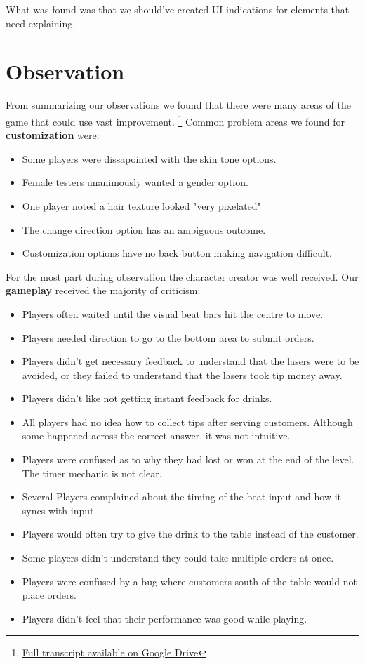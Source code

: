 \documentclass[twoside,twocolumn]{article}
\begin{document}
What was found was that we should've created UI indications for elements that need explaining.


\section{Observation}

From summarizing our observations we found that there were many areas
of the game that could use vast improvement.
\footnote{\hyperlink{https://docs.google.com/document/d/1CnQ9mCSRhZsAQdpiiN130khrFRj5-IsULWaGTs2_KgE/edit?usp=sharing}{Full transcript available on Google Drive}}
 Common problem areas we
found for \textbf{customization} were:
\begin{itemize}
    \item Some players were dissapointed with the skin tone options.
    \item Female testers unanimously wanted a gender option.
    \item One player noted a hair texture looked "very pixelated"
    \item The change direction option has an ambiguous outcome.
    \item Customization options have no back button making navigation difficult.
\end{itemize}
For the most part during observation the character creator was well received. Our \textbf{gameplay}
received the majority of criticism:
\begin{itemize}

    \item Players often waited until the visual beat bars hit the centre to move.
    \item Players needed direction to go to the bottom area to submit orders.
    \item Players didn't get necessary feedback to understand that the lasers were to be avoided, or they failed to understand that the lasers took tip money away.
    \item Players didn't like not getting instant feedback for drinks.
    \item All players had no idea how to collect tips after serving customers. Although some happened across the correct answer, it was not intuitive.
    \item Players were confused as to why they had lost or won at the end of the level. The timer mechanic is not clear.
    \item Several Players complained about the timing of the beat input and how it syncs with input.
    \item Players would often try to give the drink to the table instead of the customer.
    \item Some players didn't understand they could take multiple orders at once.
    \item Players were confused by a bug where customers south of the table would not place orders.
    \item Players didn't feel that their performance was good while playing.
\end{itemize}
\end{document}
